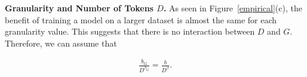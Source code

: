 



\textbf{Granularity and Number of Tokens $D$.} 
As seen in Figure~\ref{empirical}(c), the benefit of training a model on a larger dataset is almost the same for each granularity value. This suggests that there is no interaction between $D$ and $G$. Therefore, we can assume that 

 \begin{align}
     \frac{b_G}{D^{\beta_G}} = \frac{b}{D^\beta}.
\end{align}






